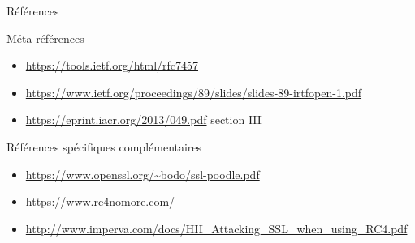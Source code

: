 \documentclass{mpg-ep-slides}
\begin{document}
\begin{frame}{Références}
  \begin{block}{Méta-références}
    \begin{itemize}
      \item \url{https://tools.ietf.org/html/rfc7457}
      \item \url{https://www.ietf.org/proceedings/89/slides/slides-89-irtfopen-1.pdf}
      \item \url{https://eprint.iacr.org/2013/049.pdf} section III
    \end{itemize}
  \end{block}

  \begin{block}{Références spécifiques complémentaires}
    \begin{itemize}
      \item \url{https://www.openssl.org/~bodo/ssl-poodle.pdf}
      \item \url{https://www.rc4nomore.com/}
      \item \url{http://www.imperva.com/docs/HII_Attacking_SSL_when_using_RC4.pdf}
    \end{itemize}
  \end{block}
\end{frame}
\end{document}
